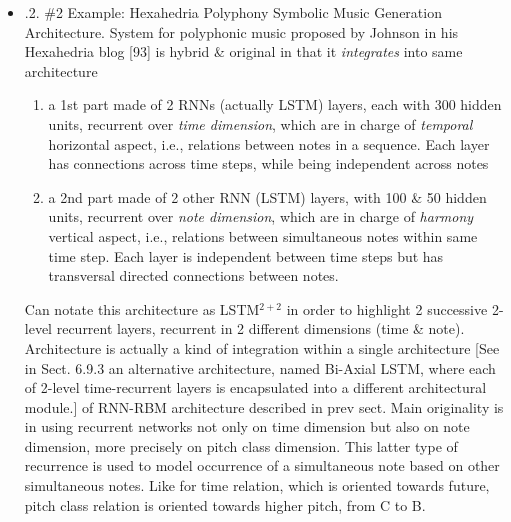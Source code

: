 \documentclass{article}
\begin{document}
\begin{itemize}
\begin{itemize}
\begin{itemize}
\begin{itemize}
				{.1.1. Other RNN-RBM Systems.} There have been a few systems following on \& extending RNN-RBM architecture, but they are not significantly different \& furthermore they have not been thoroughly evaluated. However, worth mentioning following:
				\begin{enumerate}
					\item RNN-DBN architecture [This is apparently state of art for {\sc J. S. Bach} Chorales dataset in terms of cross-entropy loss.], using multiple hidden layers [60]
					\item LSTM-RTRBM architecture, using an LSTM instead of an RNN [120].
				\end{enumerate}
			\end{itemize}
			\item {.2. \#2 Example: Hexahedria Polyphony Symbolic Music Generation Architecture.} System for polyphonic music proposed by {\sc Johnson} in his Hexahedria blog [93] is hybrid \& original in that it {\it integrates} into same architecture
			\begin{enumerate}
				\item a 1st part made of 2 RNNs (actually LSTM) layers, each with 300 hidden units, recurrent over {\it time dimension}, which are in charge of {\it temporal} horizontal aspect, i.e., relations between notes in a sequence. Each layer has connections across time steps, while being independent across notes
				\item a 2nd part made of 2 other RNN (LSTM) layers, with 100 \& 50 hidden units, recurrent over {\it note dimension}, which are in charge of {\it harmony} vertical aspect, i.e., relations between simultaneous notes within same time step. Each layer is independent between time steps but has transversal directed connections between notes.
			\end{enumerate}
			Can notate this architecture as LSTM${}^{2+2}$ in order to highlight 2 successive 2-level recurrent layers, recurrent in 2 different dimensions (time \& note). Architecture is actually a kind of integration within a single architecture [See in Sect. 6.9.3 an alternative architecture, named Bi-Axial LSTM, where each of 2-level time-recurrent layers is encapsulated into a different architectural module.] of RNN-RBM architecture described in prev sect. Main originality is in using recurrent networks not only on time dimension but also on note dimension, more precisely on pitch class dimension. This latter type of recurrence is used to model occurrence of a simultaneous note based on other simultaneous notes. Like for time relation, which is oriented towards future, pitch class relation is oriented towards higher pitch, from C to B.
			

\end{itemize}
\end{itemize}
\end{itemize}
\end{document}
